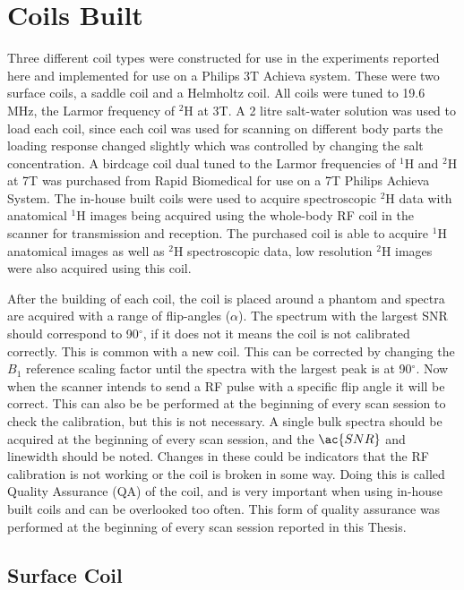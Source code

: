 
\section{Coils Built}

Three different coil types were constructed for use in the experiments reported here and implemented for use on a Philips 3T Achieva system. These were two surface coils, a saddle coil and a Helmholtz coil. All coils were tuned to 19.6 MHz, the Larmor frequency of $^2$H at 3T. A 2 litre salt-water solution was used to load each coil, since each coil was used for scanning on different body parts the loading response changed slightly which was controlled by changing the salt concentration. A birdcage coil dual tuned to the Larmor frequencies of $^1$H and $^2$H at 7T was purchased from Rapid Biomedical for use on a 7T Philips Achieva System. The in-house built coils were used to acquire spectroscopic $^2$H data with anatomical $^1$H images being acquired using the whole-body \ac{RF} coil in the scanner for transmission and reception. The purchased coil is able to acquire $^1$H anatomical images as well as $^2$H spectroscopic data, low resolution $^2$H images were also acquired using this coil.

After the building of each coil, the coil is placed around a phantom and spectra are acquired with a range of flip-angles ($\alpha$). The spectrum with the largest \ac{SNR} should correspond to 90$^\circ$, if it does not it means the coil is not calibrated correctly. This is common with a new coil. This can be corrected by changing the $B_1$ reference scaling factor until the spectra with the largest peak is at 90$^\circ$. Now when the scanner intends to send a \ac{RF} pulse with a specific flip angle it will be correct. This can also be be performed at the beginning of every scan session to check the calibration, but this is not necessary. A single bulk spectra should be acquired at the beginning of every scan session,  and  the $\ac{SNR}$ and linewidth should be noted. Changes in these could be indicators that the \ac{RF} calibration is not working or the coil is broken in some way. Doing this is called Quality Assurance (QA) of the coil, and is very important when using in-house built coils and can be overlooked too often. This form of quality assurance was performed at the beginning of every scan session reported in this Thesis.

\subsection{Surface Coil}

